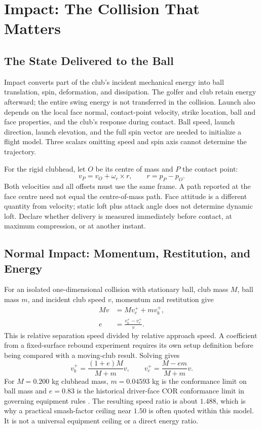\chapter{Impact: The Collision That Matters}
\label{ch:impact_collision_collision}

\section{The State Delivered to the Ball}

Impact converts part of the club's incident mechanical energy into ball
translation, spin, deformation, and dissipation. The golfer and club retain
energy afterward; the entire swing energy is not transferred in the collision.
Launch also depends on the local face normal, contact-point velocity, strike
location, ball and face properties, and the club's response during contact.
Ball speed, launch direction, launch elevation, and the full spin vector are
needed to initialize a flight model. Three scalars omitting speed and spin
axis cannot determine the trajectory.

For the rigid clubhead, let $O$ be its centre of mass and $P$ the contact point:
\begin{equation}
v_P=v_O+\omega_c\times r,\qquad r=p_P-p_O.
\end{equation}
Both velocities and all offsets must use the same frame. A path reported at
the face centre need not equal the centre-of-mass path. Face attitude is a
different quantity from velocity; static loft plus attack angle does not
determine dynamic loft. Declare whether delivery is measured immediately
before contact, at maximum compression, or at another instant.

\section{Normal Impact: Momentum, Restitution, and Energy}

For an isolated one-dimensional collision with stationary ball, club mass
$M$, ball mass $m$, and incident club speed $v$, momentum and restitution give
\begin{align}
Mv&=Mv_c^++mv_b^+,\label{eq:momentum_conservation}\\
e&=\frac{v_b^+-v_c^+}{v}.\label{eq:cor_definition}
\end{align}
This is relative separation speed divided by relative approach speed. A
coefficient from a fixed-surface rebound experiment requires its own setup
definition before being compared with a moving-club result.
Solving gives
\begin{equation}
v_b^+=\frac{(1+e)M}{M+m}v,\qquad
v_c^+=\frac{M-em}{M+m}v.
\label{eq:ball_velocity_after}
\end{equation}
For $M=0.200$ kg clubhead mass, $m=0.04593$ kg is the conformance limit on ball
mass and $e=0.83$ is the historical driver-face COR conformance limit in
governing equipment rules \citep{glossaryUSGAEquipment,club_design_cg}. The
resulting speed ratio is about $1.488$, which is why a practical smash-factor
ceiling near $1.50$ is often quoted within this model. It is not a universal
equipment ceiling or a direct energy ratio.

